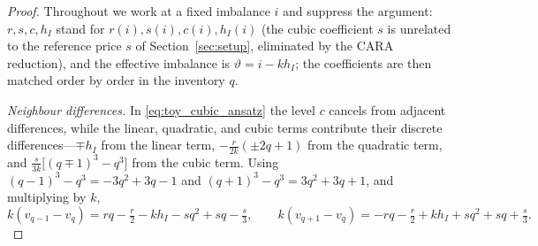 \documentclass[11pt,a4paper]{article}
\theoremstyle{plain}
\theoremstyle{definition}
\begin{document}
\begin{proof}
Throughout we work at a fixed imbalance \(i\) and suppress the argument: \(r,s,c,h_I\)
stand for \(r(i),s(i),c(i),h_I(i)\) (the cubic coefficient \(s\) is unrelated to the
reference price \(s\) of Section~\ref{sec:setup}, eliminated by the CARA reduction),
and the effective imbalance is \(\vartheta=i-kh_I\); the
coefficients are then matched order by order in the inventory \(q\).

\emph{Neighbour differences.}  In \eqref{eq:toy_cubic_ansatz} the level
\(c\) cancels from adjacent differences, while the linear, quadratic, and
cubic terms contribute their discrete differences---\(\mp h_I\) from the linear
term, \(-\tfrac{r}{2k}(\pm2q+1)\) from the quadratic term, and
\(\tfrac{s}{3k}\bigl[(q\mp1)^3-q^3\bigr]\) from the cubic term.  Using
\((q-1)^3-q^3=-3q^2+3q-1\) and \((q+1)^3-q^3=3q^2+3q+1\), and multiplying by
\(k\),
\begin{equation}
k(v_{q-1}-v_q)=r q-\tfrac r2-kh_I-s q^2+s q-\tfrac s3,
\qquad
k(v_{q+1}-v_q)=-r q-\tfrac r2+kh_I+s q^2+s q+\tfrac s3.
\label{eq:toy_cubic_neighbour}
\end{equation}


\end{proof}
\end{document}

